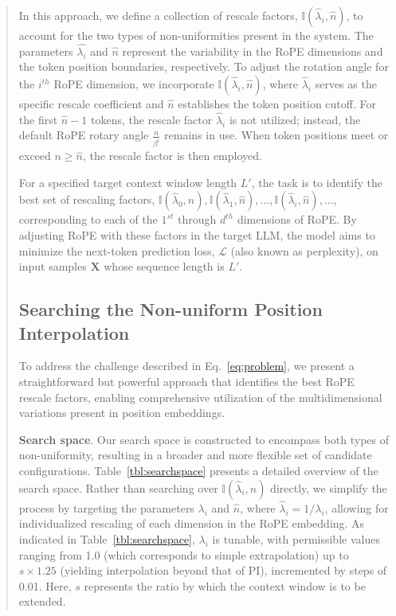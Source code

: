\begin{abstract}
In this approach, we define a collection of rescale factors, $\mathbb{I}(\hat{\lambda}_{i},\hat{n})$, to account for the two types of non-uniformities present in the system. The parameters $\hat{\lambda_i}$ and $\hat{n}$ represent the variability in the RoPE dimensions and the token position boundaries, respectively. To adjust the rotation angle for the $i^{th}$ RoPE dimension, we incorporate $\mathbb{I}(\hat{\lambda}_{i},\hat{n})$, where $\hat\lambda_{i}$ serves as the specific rescale coefficient and $\hat{n}$ establishes the token position cutoff. For the first $\hat{n}-1$ tokens, the rescale factor $\hat\lambda_{i}$ is not utilized; instead, the default RoPE rotary angle $\frac{n}{\beta^i}$ remains in use. When token positions meet or exceed $n \ge \hat{n}$, the rescale factor is then employed.

For a specified target context window length $L'$, the task is to identify the best set of rescaling factors, $\mathbb{I}(\hat{\lambda}_{0},\hat{n}), \mathbb{I}(\hat{\lambda}_{1},\hat{n}), \ldots, \mathbb{I}(\hat{\lambda}_{i},\hat{n}), \ldots$, corresponding to each of the $1^{st}$ through $d^{th}$ dimensions of RoPE. By adjusting RoPE with these factors in the target $\text{LLM}$, the model aims to minimize the next-token prediction loss, $\mathcal{L}$ (also known as perplexity), on input samples $\mathbf{X}$ whose sequence length is $L'$.

\subsection{Searching the Non-uniform Position Interpolation}

To address the challenge described in Eq.~\ref{eq:problem}, we present a straightforward but powerful approach that identifies the best RoPE rescale factors, enabling comprehensive utilization of the multidimensional variations present in position embeddings.

\textbf{Search space}. Our search space is constructed to encompass both types of non-uniformity, resulting in a broader and more flexible set of candidate configurations. Table~\ref{tbl:searchspace} presents a detailed overview of the search space. Rather than searching over $\mathbb{I}(\hat{\lambda}_{i},\hat{n})$ directly, we simplify the process by targeting the parameters $\lambda_i$ and $\hat{n}$, where $\hat{\lambda}_{i}=1/\lambda_i$, allowing for individualized rescaling of each dimension in the RoPE embedding. As indicated in Table~\ref{tbl:searchspace}, $\lambda_i$ is tunable, with permissible values ranging from 1.0 (which corresponds to simple extrapolation) up to $s\times1.25$ (yielding interpolation beyond that of PI), incremented by steps of 0.01. Here, $s$ represents the ratio by which the context window is to be extended.


\end{abstract}
